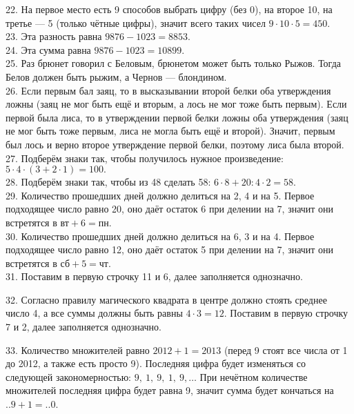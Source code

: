 22. На первое место есть 9 способов выбрать цифру (без 0), на второе 10, на третье --- 5 (только чётные цифры), значит всего таких чисел $9\cdot10\cdot5=450.$\\
23. Эта разность равна $9876-1023=8853.$\\
24. Эта сумма равна $9876-1023=10899.$\\
25. Раз брюнет говорил с Беловым, брюнетом может быть только Рыжов. Тогда Белов должен быть рыжим, а Чернов --- блондином.\\
26. Если первым бал заяц, то в высказывании второй белки оба утверждения ложны (заяц не мог быть ещё и вторым, а лось не мог тоже быть первым). Если первой была лиса, то в утверждении первой белки ложны оба утверждения (заяц не мог быть тоже первым, лиса не могла быть ещё и второй). Значит, первым был лось и верно второе утверждение первой белки, поэтому лиса была второй.\\
27. Подберём знаки так, чтобы получилось нужное произведение: $5\cdot4\cdot(3+2\cdot1) = 100.$\\
28. Подберём знаки так, чтобы из 48 сделать 58: $6\cdot8+20:4\cdot2 = 58.$\\
29. Количество прошедших дней должно делиться на 2, 4 и на 5. Первое подходящее число равно 20, оно даёт остаток 6 при делении на 7, значит они встретятся в $\text{вт}+6=\text{пн}$.\\
30. Количество прошедших дней должно делиться на 6, 3 и на 4. Первое подходящее число равно 12, оно даёт остаток 5 при делении на 7, значит они встретятся в $\text{сб}+5=\text{чт}$.\\
31. Поставим в первую строчку 11 и 6, далее заполняется однозначно.
\begin{center}
\begin{figure}[ht!]
\end{figure}
\end{center}
32. Согласно правилу магического квадрата в центре должно стоять среднее число 4, а все суммы должны быть равны $4\cdot3=12.$ Поставим в первую строчку 7 и 2, далее заполняется однозначно.
\begin{center}
\begin{figure}[ht!]
\end{figure}
\end{center}
33. Количество множителей равно $2012+1=2013$ (перед 9 стоят все числа от 1 до 2012, а также есть просто 9). Последняя цифра будет изменяться со следующей закономерностью: $9,\ 1,\ 9,\ 1,\ 9,\ldots$ При нечётном количестве множителей последняя цифра будет равна 9, значит сумма будет кончаться на $..9+1=..0$.\\
